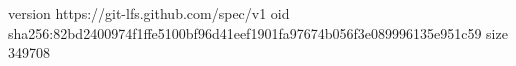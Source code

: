 version https://git-lfs.github.com/spec/v1
oid sha256:82bd2400974f1ffe5100bf96d41eef1901fa97674b056f3e089996135e951c59
size 349708

